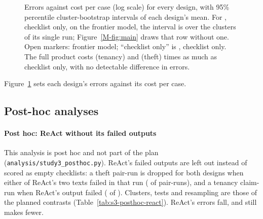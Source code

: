 \begin{figure}[t]
\centering
{}
\caption{Errors against cost per case (log scale) for every design, with 95\% percentile cluster-bootstrap intervals of each design's mean. For \casepath, checklist only, on the frontier model, the interval is over the clusters of its single run; Figure~\ref{M-fig:main} draws that row without one. Open markers: frontier model; ``checklist only'' is \casepath, checklist only. The full product costs \sthreeCostFullOverChecklistTen{} (tenancy) and \sthreeCostFullOverChecklistTh{} (theft) times as much as checklist only, with no detectable difference in errors.}
\label{fig:cost}
\end{figure}

Figure~\ref{fig:cost} sets each design's errors against its cost per case.

\subsection{Post-hoc analyses}

\paragraph{Post hoc: ReAct without its failed outputs}
This analysis is post hoc and not part of the plan (\texttt{analysis/\allowbreak{}study3\_\allowbreak{}posthoc.py}). ReAct's failed outputs are left out instead of scored as empty checklists: a theft pair-run is dropped for both designs when either of ReAct's two texts failed in that run (\sthreePostReactThDropped{} of \sthreePostReactThTotal{} pair-runs), and a tenancy claim-run when ReAct's output failed (\sthreePostReactTenStrictDropped{} of \sthreeClaimRuns). Clusters, tests and resampling are those of the planned contrasts (Table~\ref{tab:s3-posthoc-react}). ReAct's errors fall, and \casepath still makes fewer.

